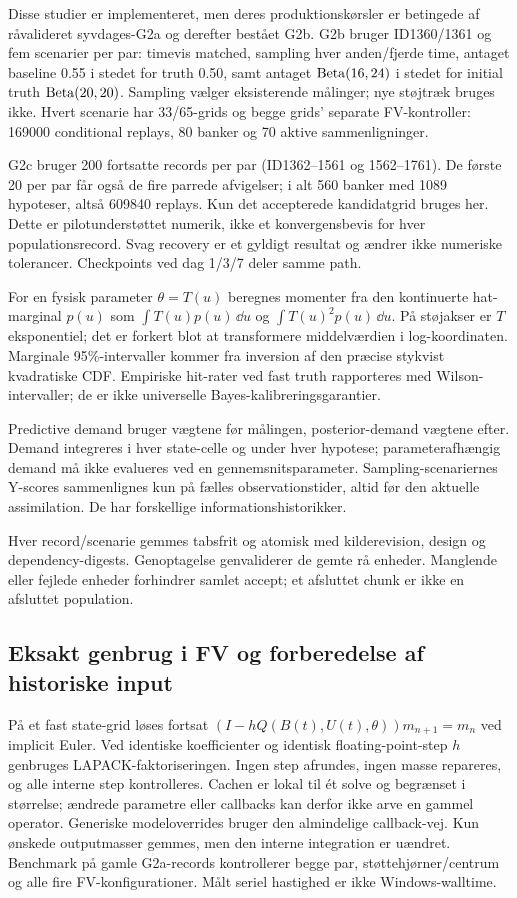 Disse studier er implementeret, men deres produktionskørsler er betingede af
råvalideret syvdages-G2a og derefter bestået G2b. G2b bruger ID1360/1361
og fem scenarier per par: timevis matched, sampling hver anden/fjerde time,
antaget baseline 0.55 i stedet for truth 0.50, samt antaget
$\operatorname{Beta}(16,24)$ i stedet for initial truth $\operatorname{Beta}(20,20)$.
Sampling vælger eksisterende målinger; nye støjtræk bruges ikke.
Hvert scenarie har 33/65-grids og begge grids' separate FV-kontroller:
169000 conditional replays, 80 banker og 70 aktive sammenligninger.

G2c bruger 200 fortsatte records per par (ID1362--1561 og 1562--1761).
De første 20 per par får også de fire parrede afvigelser; i alt 560 banker
med 1089 hypoteser, altså 609840 replays. Kun det accepterede kandidatgrid
bruges her. Dette er pilotunderstøttet numerik, ikke et konvergensbevis for
hver populationsrecord. Svag recovery er et gyldigt resultat og ændrer
ikke numeriske tolerancer. Checkpoints ved dag 1/3/7 deler samme path.

For en fysisk parameter $\theta=T(u)$ beregnes momenter fra den kontinuerte
hat-marginal $p(u)$ som $\int T(u)p(u)\,\dd u$ og
$\int T(u)^2p(u)\,\dd u$. På støjakser er $T$ eksponentiel; det er forkert
blot at transformere middelværdien i log-koordinaten. Marginale
95\%-intervaller kommer fra inversion af den præcise stykvist kvadratiske
CDF. Empiriske hit-rater ved fast truth rapporteres med Wilson-intervaller;
de er ikke universelle Bayes-kalibreringsgarantier.

Predictive demand bruger vægtene før målingen, posterior-demand vægtene
efter. Demand integreres i hver state-celle og under hver hypotese;
parameterafhængig demand må ikke evalueres ved en gennemsnitsparameter.
Sampling-scenariernes Y-scores sammenlignes kun på fælles observationstider,
altid før den aktuelle assimilation. De har forskellige informationshistorikker.

Hver record/scenarie gemmes tabsfrit og atomisk med kilderevision,
design og dependency-digests. Genoptagelse genvaliderer de gemte rå enheder.
Manglende eller fejlede enheder forhindrer samlet accept; et afsluttet
chunk er ikke en afsluttet population.

\subsection{Eksakt genbrug i FV og forberedelse af historiske input}
På et fast state-grid løses fortsat
$(I-hQ(B(t),U(t),\theta))m_{n+1}=m_n$ ved implicit Euler.
Ved identiske koefficienter og identisk floating-point-step $h$ genbruges
LAPACK-faktoriseringen. Ingen step afrundes, ingen masse repareres, og alle
interne step kontrolleres. Cachen er lokal til ét solve og begrænset i størrelse;
ændrede parametre eller callbacks kan derfor ikke arve en gammel operator.
Generiske modeloverrides bruger den almindelige callback-vej.
Kun ønskede outputmasser gemmes, men den interne integration er uændret.
Benchmark på gamle G2a-records kontrollerer begge par, støttehjørner/centrum
og alle fire FV-konfigurationer. Målt seriel hastighed er ikke Windows-walltime.

